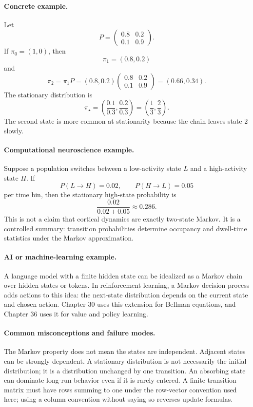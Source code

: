 \paragraph{Concrete example.}
Let
\[
P=
\begin{pmatrix}
0.8 & 0.2\\
0.1 & 0.9
\end{pmatrix}.
\]
If \(\pi_0=(1,0)\), then
\[
\pi_1=(0.8,0.2)
\]
and
\[
\pi_2=\pi_1P=(0.8,0.2)
\begin{pmatrix}
0.8 & 0.2\\
0.1 & 0.9
\end{pmatrix}
=(0.66,0.34).
\]
The stationary distribution is
\[
\pi_\star=\left(\frac{0.1}{0.3},\frac{0.2}{0.3}\right)=\left(\frac13,\frac23\right).
\]
The second state is more common at stationarity because the chain leaves state \(2\) slowly.

\paragraph{Computational neuroscience example.}
Suppose a population switches between a low-activity state \(L\) and a high-activity state \(H\). If
\[
P(L\to H)=0.02,\qquad P(H\to L)=0.05
\]
per time bin, then the stationary high-state probability is
\[
\frac{0.02}{0.02+0.05}\approx0.286.
\]
This is not a claim that cortical dynamics are exactly two-state Markov. It is a controlled summary: transition probabilities determine occupancy and dwell-time statistics under the Markov approximation.

\paragraph{AI or machine-learning example.}
A language model with a finite hidden state can be idealized as a Markov chain over hidden states or tokens. In reinforcement learning, a Markov decision process adds actions to this idea: the next-state distribution depends on the current state and chosen action. Chapter 30 uses this extension for Bellman equations, and Chapter 36 uses it for value and policy learning.

\paragraph{Common misconceptions and failure modes.}
The Markov property does not mean the states are independent. Adjacent states can be strongly dependent. A stationary distribution is not necessarily the initial distribution; it is a distribution unchanged by one transition. An absorbing state can dominate long-run behavior even if it is rarely entered. A finite transition matrix must have rows summing to one under the row-vector convention used here; using a column convention without saying so reverses update formulas.


